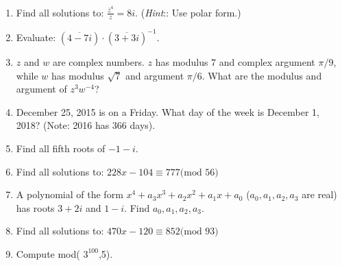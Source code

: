 \begin{enumerate}[(1)]
\item
Find all solutions to:  $\displaystyle{\frac{\bar{z}^4}{z} = 8i.}$
(\emph{Hint}:: Use polar form.)
\item
Evaluate:  $\displaystyle{( \overline{4 -7i} ) \cdot (\overline{3 + 3i})^{-1}}$.
\item
$z$ and $w$ are complex numbers. $z$ has modulus 7 and complex argument $\pi/9$, while $w$ has modulus $\sqrt{7}$ and argument $\pi/6$.  What are the modulus and argument of $z^3 w^{-4}$?
\item
December 25, 2015 is on a Friday.  What day of the week is December 1, 2018?  (Note: 2016 has 366 days).
\item
Find all fifth roots of $-1-i$.
\item
Find all solutions to:  $228 x - 104 \equiv 777 \text{(mod 56)}$
\item
A polynomial of the form $x^4 + a_3x^3 + a_2x^2 + a_1x + a_0$  ($a_0,a_1,a_2,a_3$ are real)  has roots $3+2i$ and $1-i$.  Find $a_0,a_1,a_2,a_3$.
\item
Find all solutions to:  $ 470x - 120 \equiv 852 \text{(mod 93)}$
\item
Compute mod( $3^{100}$,5). 

%


\end{enumerate}
